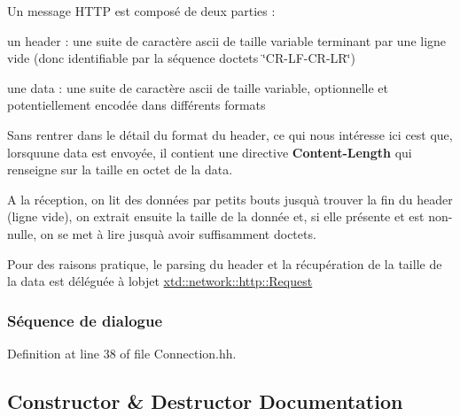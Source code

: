 Un message H\+T\+TP est composé de deux parties \+:
\begin{DoxyItemize}
\item un header \+: une suite de caractère ascii de taille variable terminant par une ligne vide (donc identifiable par la séquence d\textquotesingle{}octets \char`\"{}\+C\+R-\/\+L\+F-\/\+C\+R-\/\+L\+R\char`\"{})
\item une data \+: une suite de caractère ascii de taille variable, optionnelle et potentiellement encodée dans différents formats
\end{DoxyItemize}

Sans rentrer dans le détail du format du header, ce qui nous intéresse ici c\textquotesingle{}est que, lorsqu\textquotesingle{}une data est envoyée, il contient une directive {\bfseries Content-\/\+Length} qui renseigne sur la taille en octet de la data.

A la réception, on lit des données par petits bouts jusqu\textquotesingle{}à trouver la fin du header (ligne vide), on extrait ensuite la taille de la donnée et, si elle présente et est non-\/nulle, on se met à lire jusqu\textquotesingle{}à avoir suffisamment d\textquotesingle{}octets.

Pour des raisons pratique, le parsing du header et la récupération de la taille de la data est déléguée à l\textquotesingle{}objet \hyperlink{classxtd_1_1network_1_1http_1_1Request}{xtd\+::network\+::http\+::\+Request}

\subsubsection*{Séquence de dialogue }

 

Definition at line 38 of file Connection.\+hh.



\subsection{Constructor \& Destructor Documentation}
